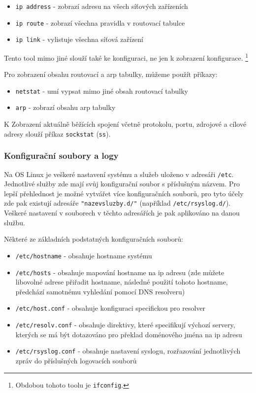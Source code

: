 \begin{itemize}
				\item \texttt{ip address} - zobrazí adresu na všech síťových zařízeních
				\item \texttt{ip route} - zobrazí všechna pravidla v routovací tabulce
				\item \texttt{ip link} - vylistuje všechna síťová zařízení
\end{itemize}

Tento tool mimo jiné slouží také ke konfiguraci, ne jen k zobrazení konfigurace. \footnote{Obdobou tohoto toolu je \texttt{ifconfig}.}


Pro zobrazení obsahu routovací a arp tabulky, můžeme použít příkazy:
\begin{itemize}
\item \texttt{netstat} - umí vypsat mimo jiné obsah routovací tabulky
\item \texttt{arp} - zobrazí obsahu arp tabulky
\end{itemize}


K Zobrazení aktuálně běžících spojení včetně protokolu, portu, zdrojové a cílové adresy slouží příkaz \texttt{sockstat} (\texttt{ss}).

\subsubsection{Konfigurační soubory a logy}
Na OS Linux je veškeré nastavení systému a služeb uloženo v adresáři \texttt{/etc}. Jednotlivé služby zde mají svůj konfigurační soubor s příslušným názvem. Pro lepší přehlednost je možné vytvářet více konfiguračních souborů, pro tyto účely zde pak existují adresáře \texttt{"nazevsluzby.d/"} (například \texttt{/etc/rsyslog.d/}). Veškeré nastavení v souborech v těchto adresářích je pak aplikováno na danou službu.

Některé ze základních podstatných konfiguračních souborů:
\begin{itemize}
				\item \texttt{/etc/hostname} - obsahuje hostname systému
				\item \texttt{/etc/hosts} - obsahuje mapování hostname na ip adresu (zde můžete libovolné adrese přiřadit hostname, následné použití tohoto hostname, předchází samotnému vyhledání pomocí DNS resolveru)
				\item \texttt{/etc/host.conf} - obsahuje konfiguraci specifickou pro resolver
				\item \texttt{/etc/resolv.conf} - obsahuje direktivy, které specifikují výchozí servery, kterých se má být dotazováno pro překlad doménového jména na ip adresu
				\item \texttt{/etc/rsyslog.conf} - obsahuje nastavení syslogu, rozřazování jednotlivých zpráv do příslušných logovacích souborů
\end{itemize}


